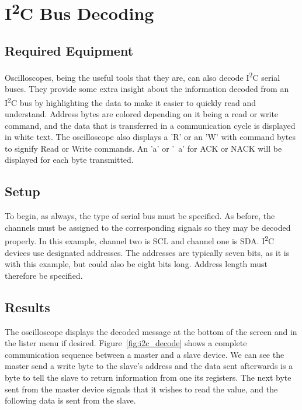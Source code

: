 \documentclass{article}
\begin{document}
  \section{I\textsuperscript{2}C Bus Decoding}

  \subsection{Required Equipment}

  Oscilloscopes, being the useful tools that they are, can also decode
  I\textsuperscript{2}C
  serial buses. They provide some extra insight about the information decoded
  from an I\textsuperscript{2}C bus by highlighting the data to make it easier to quickly read and
  understand. Address bytes are colored depending on it being a read or write
  command, and the data that is transferred in a communication cycle is
  displayed in white text. The oscilloscope also displays a 'R' or an 'W' with
  command bytes to signify Read or Write commands. An 'a' or '~a' for ACK or
  NACK will be displayed for each byte transmitted.

  \subsection{Setup}

  To begin, as always, the type of serial bus must be specified. As before, the
  channels must be assigned to the corresponding signals so they may be decoded
  properly. In this example, channel two is SCL and channel one is SDA.
  I\textsuperscript{2}C
  devices use designated addresses. The addresses are typically seven bits, as
  it is with this example, but could also be eight bits long. Address length
  must therefore be specified.

  \subsection{Results}

  The oscilloscope displays the decoded message at the bottom of the screen and
  in the lister menu if desired. Figure~\ref{fig:i2c_decode} shows a complete
  communication sequence between a master and a slave device. We can see the
  master send a write byte to the slave's address and the data sent afterwards
  is a byte to tell the slave to return information from one its registers. The
  next byte sent from the master device signals that it wishes to read the
  value, and the following data is sent from the slave.
\end{document}
